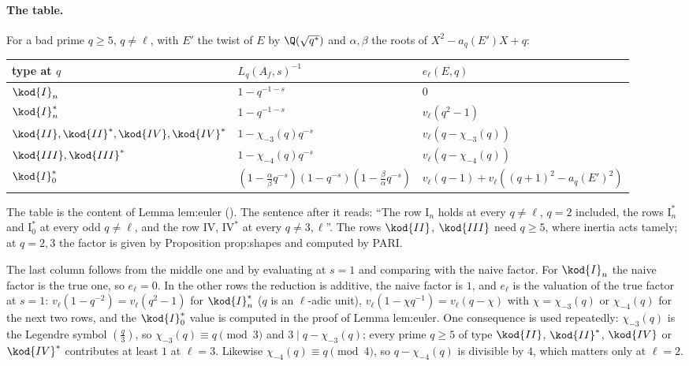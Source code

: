 \begin{sloppypar}
\paragraph{The table.} For a bad prime $q\ge5$, $q\ne\ell$, with $E'$ the twist of $E$ by $\Q(\sqrt{q^*})$ and $\alpha,\beta$ the roots of $X^2-a_q(E')X+q$:
\begin{center}\small
\begin{tabular}{lll}
\toprule
type at $q$ & $L_q(A_f,s)^{-1}$ & $e_\ell(E,q)$\\
\midrule
$\kod{I}_n$ & $1-q^{-1-s}$ & $0$\\
$\kod{I}_n^*$ & $1-q^{-1-s}$ & $v_\ell(q^2-1)$\\
$\kod{II},\kod{II}^*,\kod{IV},\kod{IV}^*$ & $1-\chi_{-3}(q)q^{-s}$ & $v_\ell(q-\chi_{-3}(q))$\\
$\kod{III},\kod{III}^*$ & $1-\chi_{-4}(q)q^{-s}$ & $v_\ell(q-\chi_{-4}(q))$\\
$\kod{I}_0^*$ & $(1-\frac\alpha\beta q^{-s})(1-q^{-s})(1-\frac\beta\alpha q^{-s})$ & $v_\ell(q-1)+v_\ell((q+1)^2-a_q(E')^2)$\\
\bottomrule
\end{tabular}
\end{center}
The table is the content of Lemma lem:euler (). The sentence after it reads: ``The row $\mathrm{I}_n$ holds at every $q\ne\ell$, $q=2$ included,
the rows $\mathrm{I}_n^*$ and $\mathrm{I}_0^*$ at every odd $q\ne\ell$, and the row $\mathrm{IV}$, $\mathrm{IV}^*$ at every $q\ne3,\ell$''. The rows $\kod{II}$, $\kod{III}$ need $q\ge5$, where
inertia acts tamely; at $q=2,3$ the factor is given by Proposition prop:shapes and computed by PARI.

The last column follows from the middle one and  by evaluating at $s=1$ and comparing with the naive factor. For $\kod{I}_n$ the naive factor is the
true one, so $e_\ell=0$. In the other rows the reduction is additive, the naive factor is $1$, and $e_\ell$ is the valuation of the true factor at $s=1$: $v_\ell(1-q^{-2})=v_\ell(q^2-1)$
for $\kod{I}_n^*$ ($q$ is an $\ell$-adic unit), $v_\ell(1-\chi q^{-1})=v_\ell(q-\chi)$ with $\chi=\chi_{-3}(q)$ or $\chi_{-4}(q)$ for the next two rows, and the $\kod{I}_0^*$ value is computed in the proof of
Lemma lem:euler. One consequence is used repeatedly: $\chi_{-3}(q)$ is the Legendre symbol $(\frac q3)$, so $\chi_{-3}(q)\equiv q\pmod3$ and $3\mid q-\chi_{-3}(q)$; every prime $q\ge5$ of type $\kod{II}$,
$\kod{II}^*$, $\kod{IV}$ or $\kod{IV}^*$ contributes at least $1$ at $\ell=3$. Likewise $\chi_{-4}(q)\equiv q\pmod4$, so $q-\chi_{-4}(q)$ is divisible by $4$, which matters only at $\ell=2$.


\end{sloppypar}
